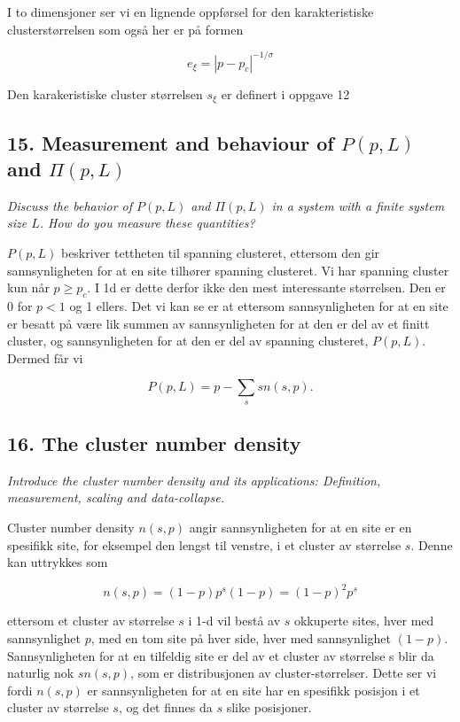 \documentclass[a4paper,10pt]{article}
\begin{document}
I to dimensjoner ser vi en lignende oppførsel for den karakteristiske clusterstørrelsen som også her er på formen 

\begin{equation}
 e_{\xi} =  |p-p_c|^{-1/\sigma}
\end{equation}

Den karakeristiske cluster størrelsen $s_{\xi}$ er definert i oppgave 12


\subsection*{15. Measurement and behaviour of $P(p,L)$ and $\Pi(p,L)$}
\textit{Discuss the behavior of $P(p, L)$ and $\Pi(p, L)$ in a system with a finite system
size $L$. How do you measure these quantities?}

$P(p,L)$ beskriver tettheten til spanning clusteret, ettersom den gir sannsynligheten for at en site tilhører spanning clusteret. Vi har spanning cluster kun når $p\geq p_c$. I 1d er dette derfor ikke den mest interessante størrelsen. Den er 0 for $p<1$ og 1 ellers. Det vi kan se er at ettersom sannsynligheten for at en site er besatt på være lik summen av sannsynligheten for at den er del av et finitt cluster, og sannsynligheten for at den er del av spanning clusteret, $P(p,L)$. Dermed får vi 

\begin{equation}
 P(p,L) = p- \sum_s sn(s,p).
\end{equation}




\subsection*{16. The cluster number density}
\textit{Introduce the cluster number density and its applications: Definition,
measurement, scaling and data-collapse.}

Cluster number density $n(s,p)$ angir sannsynligheten for at en site er en spesifikk site, for eksempel den lengst til venstre, i et cluster av størrelse $s$. Denne kan uttrykkes som

\begin{equation}
 n(s,p) = (1-p)p^s(1-p) = (1-p)^2p^s
\end{equation}

ettersom et cluster av størrelse $s$ i 1-d vil bestå av $s$ okkuperte sites, hver med sannsynlighet $p$, med en tom site på hver side, hver med sannsynlighet $(1-p)$. Sannsynligheten for at en tilfeldig site er del av et cluster av størrelse s blir da naturlig nok $s n(s,p)$, som er distribusjonen av cluster-størrelser. Dette ser vi fordi $n(s,p)$ er sannsynligheten for at en site har en spesifikk posisjon i et cluster av størrelse $s$, og det finnes da $s$ slike posisjoner.
\end{document}

